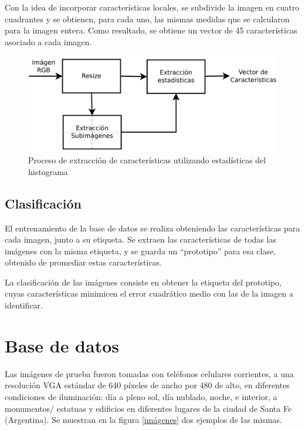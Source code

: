 \documentclass[conference,spanish,a4paper,10pt,oneside,final]{tfmpd}
\begin{document}
Con la idea de incorporar características locales, %
se subdivide  la imagen en cuatro 
cuadrantes y se obtienen, para cada uno, las mismas medidas que se calcularon para 
la imagen entera. Como resultado, se obtiene un vector de 45 características %
asociado a cada imagen.

\begin{figure}
\begin{center}
\includegraphics[scale=0.25]{../diagramas/procesoestadisticas} 
\end{center}
\caption{Proceso de extracción de características utilizando estadísticas del histograma}
\label{procesoestadisticas}
\end{figure}

\subsection{Clasificación}
El entrenamiento de la base de datos se realiza obteniendo las características
para cada imagen, junto a su etiqueta. %
Se extraen las características de todas las %
imágenes %
con la misma etiqueta, y se guarda un
``prototipo'' para esa clase, obtenido de promediar estas características.

La clasificación de las imágenes consiste en %
obtener la etiqueta del prototipo, cuyas características 
minimicen el error cuadrático medio con las de
la imagen a identificar.
%
%
%
%
\section{Base de datos}
Las imágenes de prueba fueron tomadas con teléfonos celulares corrientes, a una
resolución VGA estándar de 640 píxeles de ancho por 480 de alto, en
diferentes condiciones
de iluminación: día a pleno sol, día nublado, noche, e interior, a monumentos/%
estatuas y edificios en diferentes lugares de la ciudad de Santa Fe (Argentina).
Se muestran en la figura \ref{imágenes} dos ejemplos de las mismas.
%
%
%
%
\end{document}
